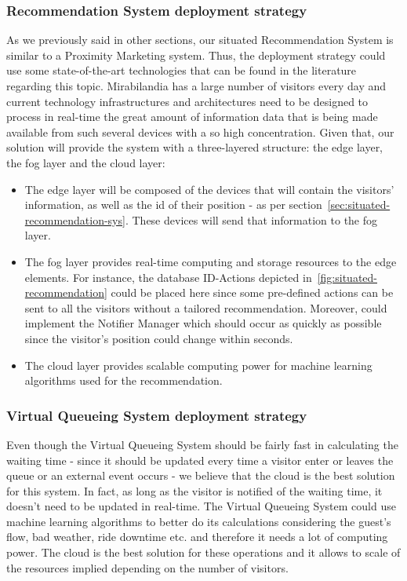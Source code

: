 \subsubsection{Recommendation System deployment strategy}
As we previously said in other sections, our situated Recommendation System is similar to a Proximity Marketing system.
Thus, the deployment strategy could use some state-of-the-art technologies that can be found in the literature regarding this topic.
Mirabilandia has a large number of visitors every day and current technology infrastructures and architectures need to be designed to process in real-time the great amount of information data that is being made available from such several devices with a so high concentration.
Given that, our solution will provide the system with a three-layered structure: the edge layer, the fog layer and the cloud layer:
\begin{itemize}
	\item The edge layer will be composed of the devices that will contain the visitors' information, as well as the id of their position - as per section~\ref{sec:situated-recommendation-sys}.
	These devices will send that information to the fog layer.
	\item The fog layer provides real-time computing and storage
	resources to the edge elements. For instance, the database ID-Actions depicted in~\ref{fig:situated-recommendation} could be placed here since some pre-defined actions can be sent to all the visitors without a tailored recommendation.
	Moreover, could implement the Notifier Manager which should occur as quickly as possible since the visitor's position could change within seconds.
	\item The cloud layer provides scalable computing power for machine learning algorithms used for the recommendation.
\end{itemize}

\subsubsection{Virtual Queueing System deployment strategy}
Even though the Virtual Queueing System should be fairly fast in calculating the waiting time - since it should be updated every time a visitor enter or leaves the queue or an external event occurs - we believe that the cloud is the best solution for this system.
In fact, as long as the visitor is notified of the waiting time, it doesn't need to be updated in real-time.
The Virtual Queueing System could use machine learning algorithms to better do its calculations considering the guest's flow, bad weather, ride downtime etc. and therefore it needs a lot of computing power.
The cloud is the best solution for these operations and it allows to scale of the resources implied depending on the number of visitors.

